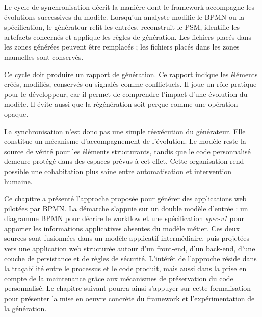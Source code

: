Le cycle de synchronisation décrit la manière dont le framework accompagne les évolutions successives du modèle. Lorsqu'un analyste modifie le BPMN ou la spécification, le générateur relit les entrées, reconstruit le PSM, identifie les artefacts concernés et applique les règles de génération. Les fichiers placés dans les zones générées peuvent être remplacés ; les fichiers placés dans les zones manuelles sont conservés.

Ce cycle doit produire un rapport de génération. Ce rapport indique les éléments créés, modifiés, conservés ou signalés comme conflictuels. Il joue un rôle pratique pour le développeur, car il permet de comprendre l'impact d'une évolution du modèle. Il évite aussi que la régénération soit perçue comme une opération opaque.

La synchronisation n'est donc pas une simple réexécution du générateur. Elle constitue un mécanisme d'accompagnement de l'évolution. Le modèle reste la source de vérité pour les éléments structurants, tandis que le code personnalisé demeure protégé dans des espaces prévus à cet effet. Cette organisation rend possible une cohabitation plus saine entre automatisation et intervention humaine.


Ce chapitre a présenté l'approche proposée pour générer des applications web pilotées par BPMN. La démarche s'appuie sur un double modèle d'entrée : un diagramme BPMN pour décrire le workflow et une spécification \textit{spec-v1} pour apporter les informations applicatives absentes du modèle métier. Ces deux sources sont fusionnées dans un modèle applicatif intermédiaire, puis projetées vers une application web structurée autour d'un front-end, d'un back-end, d'une couche de persistance et de règles de sécurité. L'intérêt de l'approche réside dans la traçabilité entre le processus et le code produit, mais aussi dans la prise en compte de la maintenance grâce aux mécanismes de préservation du code personnalisé. Le chapitre suivant pourra ainsi s'appuyer sur cette formalisation pour présenter la mise en oeuvre concrète du framework et l'expérimentation de la génération.
